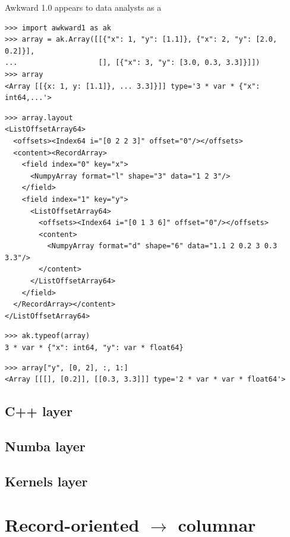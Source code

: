 \documentclass{webofc}
\begin{document}
Awkward 1.0 appears to data analysts as a 

\begin{verbatim}
>>> import awkward1 as ak
>>> array = ak.Array([[{"x": 1, "y": [1.1]}, {"x": 2, "y": [2.0, 0.2]}],
...                   [], [{"x": 3, "y": [3.0, 0.3, 3.3]}]])
>>> array
<Array [[{x: 1, y: [1.1]}, ... 3.3]}]] type='3 * var * {"x": int64,...'>
\end{verbatim}

\begin{verbatim}
>>> array.layout
<ListOffsetArray64>
  <offsets><Index64 i="[0 2 2 3]" offset="0"/></offsets>
  <content><RecordArray>
    <field index="0" key="x">
      <NumpyArray format="l" shape="3" data="1 2 3"/>
    </field>
    <field index="1" key="y">
      <ListOffsetArray64>
        <offsets><Index64 i="[0 1 3 6]" offset="0"/></offsets>
        <content>
          <NumpyArray format="d" shape="6" data="1.1 2 0.2 3 0.3 3.3"/>
        </content>
      </ListOffsetArray64>
    </field>
  </RecordArray></content>
</ListOffsetArray64>
\end{verbatim}

\begin{verbatim}
>>> ak.typeof(array)
3 * var * {"x": int64, "y": var * float64}
\end{verbatim}


\begin{verbatim}
>>> array["y", [0, 2], :, 1:]
<Array [[[], [0.2]], [[0.3, 3.3]]] type='2 * var * var * float64'>
\end{verbatim}

\subsection{C++ layer}

\subsection{Numba layer}

\subsection{Kernels layer}

\section{Record-oriented $\to$ columnar}
\label{lab:fillablearray}

\end{document}
